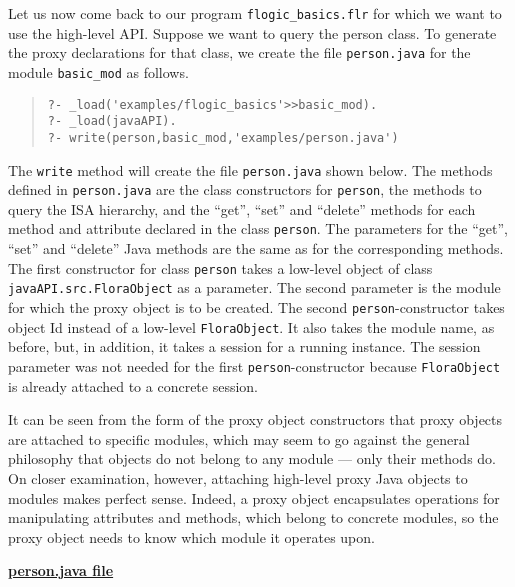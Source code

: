 Let us now come back to our program {\tt flogic\_basics.flr} for which we
want to use the high-level API.  Suppose we want to query the person class.
To generate the proxy declarations for that class, we create
the file {\tt person.java} for the 
module {\tt basic\_mod} as follows.
\begin{quote}
\begin{verbatim}
?- _load('examples/flogic_basics'>>basic_mod).
?- _load(javaAPI).
?- write(person,basic_mod,'examples/person.java')
\end{verbatim}
\end{quote}


The {\tt write} method will create the file {\tt person.java} shown
below.  The methods defined in {\tt person.java} are the class constructors
for {\tt person}, the methods to query the ISA hierarchy, and the ``get'',
``set'' and ``delete'' methods for each method and attribute declared in
the \FLORA class {\tt person}.  The parameters for the ``get'', ``set'' and
``delete'' Java methods are the same as for the corresponding \FLORA
methods. The first constructor for class {\tt person} takes a low-level
object of class {\tt javaAPI.src.FloraObject} as a
parameter. The second parameter is the \FLORA module for which the proxy
object is to be created.
The second {\tt person}-constructor takes \fl object Id instead of a
low-level {\tt FloraObject}. It also takes the module name, as before, but,
in addition, it takes a session for a running \FLORA instance.
The session parameter was not needed for the first {\tt person}-constructor
because {\tt FloraObject} is already attached to a concrete session.  

It can be seen from the form of the proxy object constructors that
proxy objects are attached to specific \FLORA modules, which may seem to
go against the general philosophy that \fl objects do not belong to any
module --- only their methods do. On closer examination, however, attaching
high-level proxy Java objects to modules makes perfect sense. Indeed, a
proxy object encapsulates operations for manipulating \fl attributes 
and methods, which belong to concrete \FLORA modules, so the proxy object
needs to know which module it operates upon.


\underline{{\bf person.java file}}


